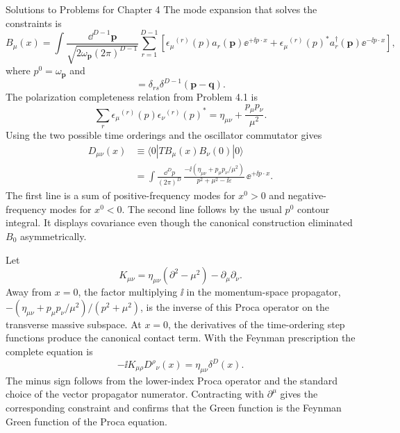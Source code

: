 \begin{bankssolutions}{Solutions to Problems for Chapter 4}
The mode expansion that solves the constraints is
\begin{equation*}
 B_\mu(x)=\int\frac{\dd^{D-1}\mathbf p}
 {\sqrt{2\omega_{\mathbf p}(2\pi)^{D-1}}}
 \sum_{r=1}^{D-1}\left[\epsilon_\mu{}^{(r)}(p)a_r(\mathbf p)\ee^{+\ii p\cdot x}
 +\epsilon_\mu{}^{(r)}(p)^*a_r^\dagger(\mathbf p)\ee^{-\ii p\cdot x}\right],
\end{equation*}
where $p^0=\omega_{\mathbf p}$ and
\begin{equation*}
 [a_r(\mathbf p),a_s^\dagger(\mathbf q)]
 =\delta_{rs}\delta^{D-1}(\mathbf p-\mathbf q).
\end{equation*}
The polarization completeness relation from Problem 4.1 is
\begin{equation*}
 \sum_r\epsilon_\mu{}^{(r)}(p)\epsilon_\nu{}^{(r)}(p)^*
 =\eta_{\mu\nu}+\frac{p_\mu p_\nu}{\mu^2}.
\end{equation*}
Using the two possible time orderings and the oscillator commutator gives
\begin{align*}
 D_{\mu\nu}(x)&\equiv\langle0|TB_\mu(x)B_\nu(0)|0\rangle\\
 &=\int\frac{\dd^D p}{(2\pi)^D}\,
 \frac{-\ii\left(\eta_{\mu\nu}+p_\mu p_\nu/\mu^2\right)}
 {p^2+\mu^2-\ii\varepsilon}\,\ee^{+\ii p\cdot x}.
\end{align*}
The first line is a sum of positive-frequency modes for $x^0>0$ and
negative-frequency modes for $x^0<0$.  The second line follows by the usual
$p^0$ contour integral.  It displays covariance even though the canonical
construction eliminated $B_0$ asymmetrically.

Let
\begin{equation*}
 K_{\mu\nu}=\eta_{\mu\nu}(\partial^2-\mu^2)-\partial_\mu\partial_\nu.
\end{equation*}
Away from $x=0$, the factor multiplying $\ii$ in the momentum-space propagator,
$-(\eta_{\mu\nu}+p_\mu p_\nu/\mu^2)/(p^2+\mu^2)$, is the inverse of this
Proca operator on the transverse massive subspace.  At $x=0$, the
derivatives of the time-ordering step functions produce the canonical contact
term.  With the Feynman prescription the complete equation is
\begin{equation*}
 -\ii K_{\mu\rho}D^{\rho}{}_{\nu}(x)
 =\eta_{\mu\nu}\delta^D(x).
\end{equation*}
The minus sign follows from the lower-index Proca operator and the standard
choice of the vector propagator numerator.  Contracting with $\partial^\mu$ gives the corresponding
constraint and confirms that the Green function is the Feynman Green function
of the Proca equation.


\end{bankssolutions}
